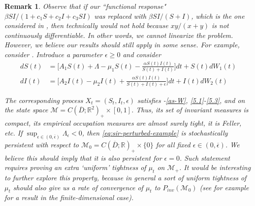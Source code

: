\documentclass[final]{amsart}
\newtheorem{rem}[thm]{Remark}
\numberwithin{thm}{section}
\numberwithin{equation}{section}
\newcommand{\mcM}{\mathcal{M}}
\newcommand{\R}{\mathbb{R}}
\newcommand{\inv}{\mathcal{M}_+}
\begin{document}
\begin{rem}
    Observe that if our ``functional response" $\beta SI/(1+c_1S+c_2I+c_3SI)$ was replaced with $\beta SI/(S+I)$, which is the one considered in \cite{stochastic-SIR-NN}, then technically  would not hold because $xy/(x+y)$ is not continuously differentiable. In other words, we cannot linearize the problem. However, we believe our results should still apply in some sense. For example, consider \cite[(2.4)]{stochastic-SIR-NN}. Introduce a parameter $\epsilon \geq 0$ and consider 
    \begin{equation}\label{eq:sir-perturbed-example}
            \begin{aligned}
        dS(t) &= \Big[A_1S(t) + \Lambda - \mu_1S(t) - \frac{\alpha S(t)I(t)}{S(t) + I(t)}\Big]dt + S(t)dW_1(t) \\
        dI(t) &= \Big[A_2I(t) - \mu_2I(t) + \frac{\alpha S(t)I(t)}{S(t)+I(t)+\epsilon}\Big]dt + I(t)dW_2(t)
    \end{aligned}
    \end{equation}

    The corresponding process $X_t = (S_t,I_t,\epsilon)$ satisfies -\ref{as-W}, \ref{5.1}-\ref{5.3}, and  on the state space $\mcM = C(\overline D;\R^2)_+ \times [0,1]$. Thus, its set of invariant measures is compact, its empirical occupation measures are almost surely tight, it is Feller, etc. If $\sup_{\epsilon \in (0,\overline \epsilon)} \Lambda_\epsilon < 0$, then \eqref{eq:sir-perturbed-example} is stochastically persistent with respect to $\mcM_0 = C(\overline D;\R)_+ \times \{0\}$ for all fixed $\epsilon \in (0,\overline \epsilon)$. We believe this should imply that it is also persistent for $\epsilon = 0$. Such statement  requires proving an extra `uniform' tightness of $\mu_t$ on $\inv$. It would be interesting to further explore this property, because in general a sort of uniform tightness of $\mu_t$ should also give us a rate of convergence of $\mu_t$ to $P_{inv}(\mcM_0)$ (see for example \cite[Theorem 4.11, Theorem 4.13]{persistence} for a result in the finite-dimensional case).
\end{rem}
\end{document}

